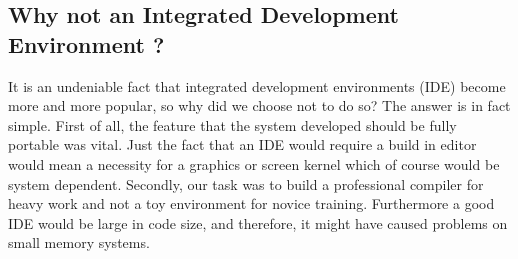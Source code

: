 \subsection{Why not an Integrated Development Environment ?}
It is an undeniable fact that  integrated  development  environments  (IDE)
become more and more popular, so why did we choose not to do so? The answer
is  in  fact  simple.  First  of all, the feature that the system developed
should be fully \C portable was vital. Just the fact  that  an  IDE  would
require  a  build in editor would mean a necessity for a graphics or screen
kernel which of course would be system dependent. Secondly, our task was to
build  a professional compiler for heavy work and not a toy environment for
novice training. Furthermore a good IDE would be large in  code  size,  and
therefore, it might have caused problems on small memory systems.

